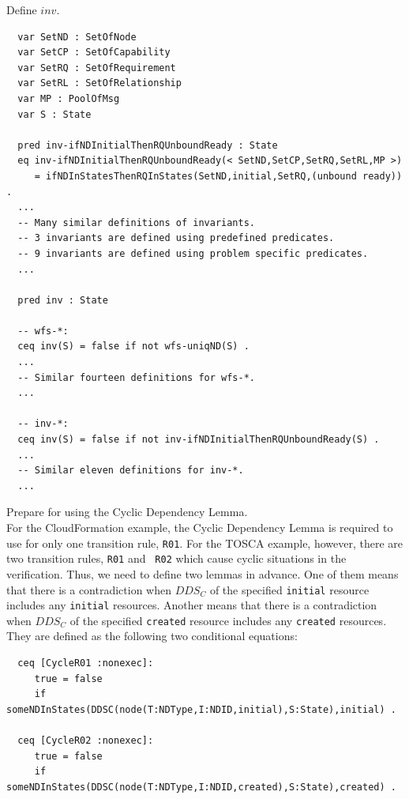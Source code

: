 \documentclass[12pt]{report}
\begin{document}
 Define $inv$. 
\small
\begin{verbatim}
  var SetND : SetOfNode
  var SetCP : SetOfCapability
  var SetRQ : SetOfRequirement
  var SetRL : SetOfRelationship
  var MP : PoolOfMsg
  var S : State

  pred inv-ifNDInitialThenRQUnboundReady : State
  eq inv-ifNDInitialThenRQUnboundReady(< SetND,SetCP,SetRQ,SetRL,MP >)
     = ifNDInStatesThenRQInStates(SetND,initial,SetRQ,(unbound ready)) .
  ...
  -- Many similar definitions of invariants.
  -- 3 invariants are defined using predefined predicates.
  -- 9 invariants are defined using problem specific predicates.
  ...

  pred inv : State

  -- wfs-*:
  ceq inv(S) = false if not wfs-uniqND(S) .
  ...
  -- Similar fourteen definitions for wfs-*.  
  ...

  -- inv-*:
  ceq inv(S) = false if not inv-ifNDInitialThenRQUnboundReady(S) .
  ...
  -- Similar eleven definitions for inv-*.  
  ...

\end{verbatim}
\normalsize

 Prepare for using the Cyclic Dependency
Lemma. \\
For the CloudFormation example, the Cyclic Dependency Lemma is
required to use for only one transition rule, {\tt R01}. For
the TOSCA example, however, there are two transition rules, {\tt R01} and {\tt
  R02} which cause cyclic situations in the verification. Thus, we
need to define two lemmas in advance.  One of them means that there is
a contradiction when $DDS\!_C$ of the specified {\tt initial} resource
includes any {\tt initial} resources.  Another means that there is a
contradiction when $DDS\!_C$ of the specified {\tt created} resource
includes any {\tt created} resources.  They are defined as the
following two conditional equations:
\small
\begin{verbatim}
  ceq [CycleR01 :nonexec]: 
     true = false
     if someNDInStates(DDSC(node(T:NDType,I:NDID,initial),S:State),initial) .

  ceq [CycleR02 :nonexec]: 
     true = false
     if someNDInStates(DDSC(node(T:NDType,I:NDID,created),S:State),created) .

\end{verbatim}
\normalsize
\end{document}
